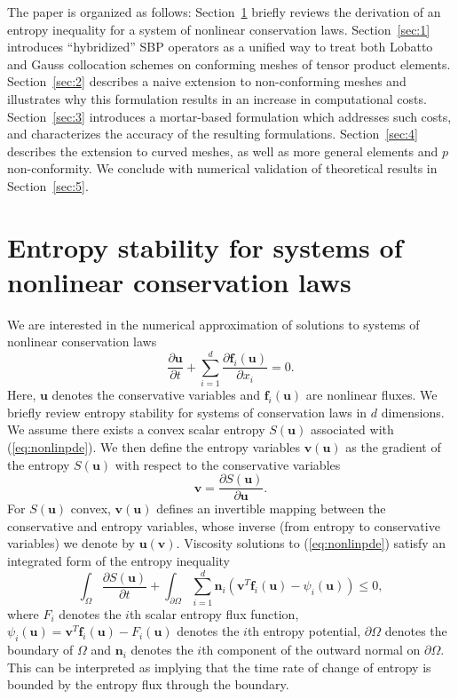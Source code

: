 \documentclass{svjour3}                     %
\newcommand{\pd}[2]{\frac{\partial#1}{\partial#2}}
\newcommand{\LRp}[1]{\left( #1 \right)}
\begin{document}
The paper is organized as follows: Section~\ref{sec:0} briefly reviews the derivation of an entropy inequality for a system of nonlinear conservation laws.  Section~\ref{sec:1} introduces ``hybridized'' SBP operators as a unified way to treat both Lobatto and Gauss collocation schemes on conforming meshes of tensor product elements.  Section~\ref{sec:2} describes a naive extension to non-conforming meshes and illustrates why this formulation results in an increase in computational costs.  Section~\ref{sec:3} introduces a mortar-based formulation which addresses such costs, and characterizes the accuracy of the resulting formulations.  Section~\ref{sec:4} describes the extension to curved meshes, as well as more general elements and $p$ non-conformity.  We conclude with numerical validation of theoretical results in Section~\ref{sec:5}.  

\section{Entropy stability for systems of nonlinear conservation laws}
\label{sec:0}
We are interested in the numerical approximation of solutions to systems of nonlinear conservation laws
\begin{equation}
\pd{\bm{u}}{t} + \sum_{i=1}^d \pd{\bm{f}_i\LRp{\bm{u}}}{x_i} = 0.
\label{eq:nonlinpde}
\end{equation}
Here, $\bm{u}$ denotes the conservative variables and $\bm{f}_i(\bm{u})$ are nonlinear fluxes.  We briefly review entropy stability for systems of conservation laws in $d$ dimensions.  We assume there exists a convex scalar entropy $S(\bm{u})$ associated with (\ref{eq:nonlinpde}).  We then define the entropy variables $\bm{v}(\bm{u})$ as the gradient of the entropy $S(\bm{u})$ with respect to the conservative variables 
\[
\bm{v} = \pd{S(\bm{u})}{\bm{u}}.  
\]
For $S(\bm{u})$ convex, $\bm{v}(\bm{u})$ defines an invertible mapping between the conservative and entropy variables, whose inverse (from entropy to conservative variables) we denote by $\bm{u}(\bm{v})$.  Viscosity solutions to (\ref{eq:nonlinpde}) satisfy an integrated form of the entropy inequality \cite{dafermos2005compensated}
\begin{equation}
\int_{\Omega} \pd{S(\bm{u})}{t} + \int_{\partial \Omega} \sum_{i=1}^d \bm{n}_i \LRp{\bm{v}^T\bm{f}_i(\bm{u}) - \psi_i(\bm{u})} \leq 0,
\label{eq:weakentropyineq}
\end{equation}
where $F_i$ denotes the $i$th scalar entropy flux function, $\psi_i(\bm{u}) = \bm{v}^T\bm{f}_i(\bm{u}) - F_i(\bm{u})$ denotes the $i$th entropy potential, $\partial \Omega$ denotes the boundary of $\Omega$ and $\bm{n}_i$ denotes the $i$th component of the outward normal on $\partial \Omega$.  This can be interpreted as implying that the time rate of change of entropy is bounded by the entropy flux through the boundary.
\end{document}
